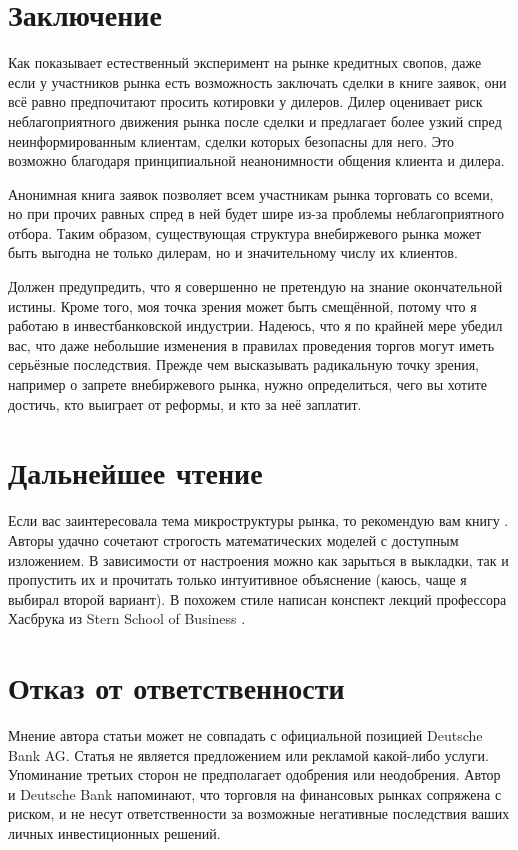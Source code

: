 \section*{Заключение}

Как показывает естественный эксперимент на рынке кредитных свопов, даже если у
участников рынка есть возможность заключать сделки в книге заявок, они всё равно
предпочитают просить котировки у дилеров. Дилер оценивает риск неблагоприятного
движения рынка после сделки и предлагает более узкий спред неинформированным
клиентам, сделки которых безопасны для него. Это возможно благодаря
принципиальной неанонимности общения клиента и дилера.

Анонимная книга заявок позволяет всем участникам рынка торговать со всеми, но
при прочих равных спред в ней будет шире из-за проблемы неблагоприятного отбора.
Таким образом, существующая структура внебиржевого рынка может быть выгодна не
только дилерам, но и значительному числу их клиентов.

Должен предупредить, что я совершенно не претендую на знание окончательной
истины. Кроме того, моя точка зрения может быть смещённой, потому что я работаю
в инвестбанковской индустрии. Надеюсь, что я по крайней мере убедил вас, что
даже небольшие изменения в правилах проведения торгов могут иметь серьёзные
последствия. Прежде чем высказывать радикальную точку зрения, например о запрете
внебиржевого рынка, нужно определиться, чего вы хотите достичь, кто выиграет от
реформы, и кто за неё заплатит.

\section*{Дальнейшее чтение}

Если вас заинтересовала тема микроструктуры рынка, то рекомендую вам книгу
\cite{foucault2013market}.
Авторы удачно сочетают строгость математических моделей с доступным изложением.
В зависимости от настроения можно как зарыться в выкладки, так и пропустить их и
прочитать только интуитивное объяснение (каюсь, чаще я выбирал второй вариант).
В похожем стиле написан конспект лекций профессора Хасбрука из Stern School of
Business \cite{hasbrouck2017securities}.

\section*{Отказ от ответственности}

Мнение автора статьи может не совпадать с официальной позицией Deutsche Bank AG.
Статья не является предложением или рекламой какой-либо услуги. Упоминание
третьих сторон не предполагает одобрения или неодобрения. Автор и Deutsche Bank
напоминают, что торговля на финансовых рынках сопряжена с риском, и не несут
ответственности за возможные негативные последствия ваших личных инвестиционных
решений.

\begin{otherlanguage}{english}
\printbibliography[title = \begin{otherlanguage}{russian}Список
литературы\end{otherlanguage}]
\end{otherlanguage}

\printendnotes

